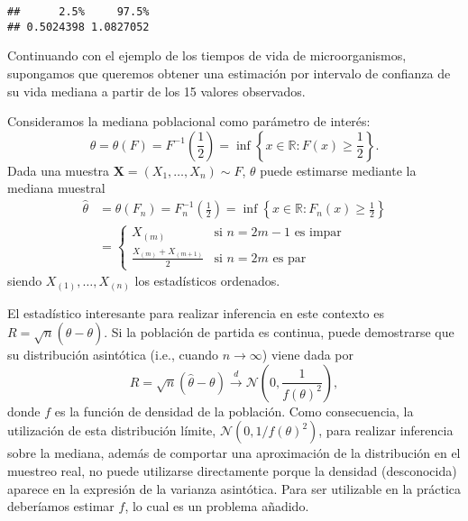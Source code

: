 \documentclass[
]{book}
\theoremstyle{definition}
\theoremstyle{definition}
\theoremstyle{definition}
\theoremstyle{remark}
\let\BeginKnitrBlock\begin \let\EndKnitrBlock\end
\begin{document}
\begin{verbatim}
##      2.5%     97.5% 
## 0.5024398 1.0827052
\end{verbatim}

\BeginKnitrBlock{example}[Inferencia sobre la mediana]
\protect\hypertarget{exm:mediana}{}{\label{exm:mediana} \iffalse (Inferencia sobre la mediana) \fi{} } \vspace{0.5cm}

Continuando con el ejemplo de los tiempos de vida de microorganismos,
supongamos que queremos obtener una estimación por intervalo de confianza
de su vida mediana a partir de los 15 valores observados.
\EndKnitrBlock{example}

Consideramos la mediana poblacional como parámetro de interés:
\[\theta = \theta \left( F \right) = F^{-1}\left( \frac{1}{2} \right) 
= \inf \left\{ x\in \mathbb{R} : F\left( x \right) \geq \frac{1}{2}\right\}.\]
Dada una muestra \(\mathbf{X}=\left( X_1,\ldots ,X_n \right) \sim F\), \(\theta\) puede estimarse mediante la mediana muestral
\[\begin{aligned}
\hat{\theta} &= \theta \left( F_n \right) =F_n^{-1}\left( \frac{1}{2} \right) 
=\inf \left\{ x\in \mathbb{R} : F_n\left( x \right) \geq \frac{1}{2}
\right\} \\
&= \left\{ 
\begin{array}{ll}
X_{(m)} & \text{si } n=2m-1 \text{ es impar} \\ 
\frac{X_{(m)}+X_{\left( m+1 \right)}}{2} & \text{si } n=2m \text{ es par}
\end{array}
\right.
\end{aligned}\]
siendo \(X_{(1)},\ldots ,X_{(n)}\) los estadísticos ordenados.

El estadístico interesante para realizar inferencia en este contexto es
\(R=\sqrt{n}\left( \hat{\theta}-\theta \right)\). Si la población de
partida es continua, puede demostrarse que su distribución asintótica
(i.e., cuando \(n \rightarrow \infty\)) viene dada por
\[R=\sqrt{n}\left( \hat{\theta}-\theta \right) \overset{d}{\rightarrow }
\mathcal{N}\left( 0,\frac{1}{f\left( \theta \right)^2} \right),\]donde \(f\) es
la función de densidad de la población. Como consecuencia, la
utilización de esta distribución límite,
\(\mathcal{N}\left( 0, 1/f\left( \theta \right)^2 \right)\), para realizar
inferencia sobre la mediana, además de comportar una aproximación de la
distribución en el muestreo real, no puede utilizarse directamente
porque la densidad (desconocida) aparece en la expresión de la varianza
asintótica. Para ser utilizable en la práctica deberíamos estimar \(f\),
lo cual es un problema añadido.
\end{document}
